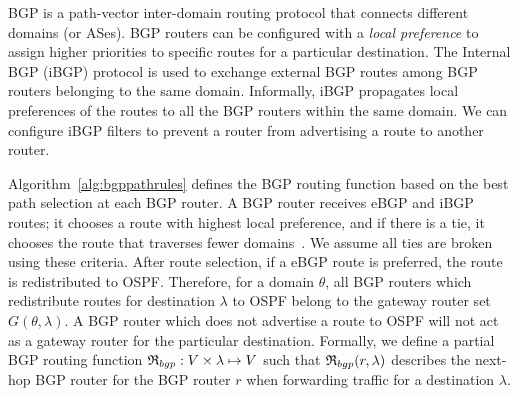  BGP is a path-vector inter-domain routing protocol
that connects different domains (or ASes).  
BGP routers can be configured with a
\emph{local preference} 
to assign higher priorities to
specific routes for a 
particular destination. 
The Internal BGP (iBGP) protocol is used to 
exchange external BGP routes 
among BGP routers belonging
to the same domain. 
Informally, iBGP propagates local 
preferences of the routes to all the BGP 
routers within the same domain. 
We can configure iBGP 
filters to prevent a router from advertising 
a route to another router. 

\iffull
 
Algorithm~\ref{alg:bgppathrules} defines the BGP routing function
based on the best path selection at each BGP router. 
\fi
A BGP router receives eBGP and iBGP routes; it  
chooses a route with highest local preference, 
and if there is a tie, it chooses the route that traverses 
fewer domains~\cite{bgp}. 
We assume all ties 
are broken using these criteria. After route selection, 
if a eBGP route is preferred, the route is redistributed to OSPF.
Therefore, for a domain $\theta$, all BGP routers which
redistribute routes for destination $\lambda$ to OSPF  
belong to the gateway router set $G(\theta, \lambda)$.
A BGP router which does not advertise a route to OSPF will 
not act as a gateway router for the particular destination.
Formally, we define a partial BGP routing function 
$\mathfrak{R}_{bgp}: V \times \lambda \mapsto V$
such that
$\mathfrak{R}_{bgp}(r,\lambda)$
describes the next-hop BGP router for the BGP
router $r$ when forwarding traffic for a destination $\lambda$. 


